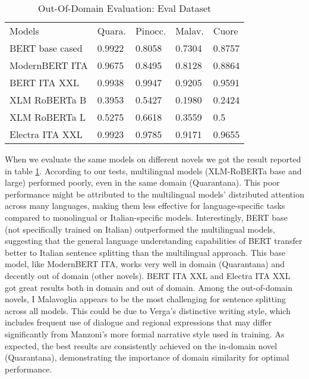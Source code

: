 \documentclass[11pt]{article}
\begin{document}
\begin{table}[]
	\small
	\caption{Out-Of-Domain Evaluation: Eval Dataset}
	\begin{tabular}{lllll}
		Models & Quara. & Pinocc. & Malav. & Cuore \\
		BERT base cased & 0.9922      & 0.8058 & 0.7304        & 0.8757                  \\
		ModernBERT ITA  & 0.9675     & 0.8495   & 0.8128   & 0.8864                  \\
		BERT ITA XXL  & 0.9938      & 0.9947   & 0.9205     & 0.9591                 \\
		XLM RoBERTa B & 0.3953       & 0.5427   & 0.1980     & 0.2424                 \\
		XLM RoBERTa L & 0.5275       & 0.6618    & 0.3559   & 0.5               \\
		Electra ITA XXL  & 0.9923       & 0.9785    & 0.9171    & 0.9655             
	\end{tabular}
	\label{t2}
\end{table}
When we evaluate the same models on different novels we got the
result reported in table \ref{t2}. \newline According to our tests, multilingual models (XLM-RoBERTa base and large) performed poorly, even in the same domain (Quarantana). \newline This poor performance might be attributed to the multilingual models' distributed attention across many languages, making them less effective for language-specific tasks compared to monolingual or Italian-specific models. \newline Interestingly, BERT base (not specifically trained on Italian) outperformed the multilingual models, suggesting that the general language understanding capabilities of BERT transfer better to Italian sentence splitting than the multilingual approach. \newline This base model, like ModernBERT ITA, works very well in domain (Quarantana) and decently out of domain (other novels). \newline BERT ITA XXL and Electra ITA XXL got great results both in domain and out of domain. \newline Among the out-of-domain novels, I Malavoglia appears to be the most challenging for sentence splitting across all models. \newline This could be due to Verga's distinctive writing style, which includes frequent use of dialogue and regional expressions that may differ significantly from Manzoni's more formal narrative style used in training. \newline As expected, the best results are consistently achieved on the in-domain novel (Quarantana), demonstrating the importance of domain similarity for optimal performance.
\end{document}
